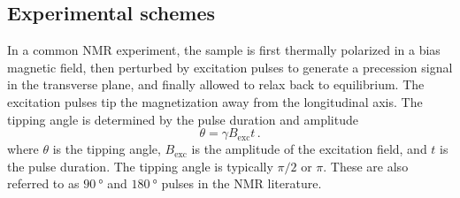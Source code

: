 



\subsection{Experimental schemes}
In a common NMR experiment, the sample is first thermally polarized in a bias magnetic field, then perturbed by excitation pulses to generate a precession signal in the transverse plane, and finally allowed to relax back to equilibrium.
The excitation pulses tip the magnetization away from the longitudinal axis. The tipping angle is determined by the pulse duration and amplitude
\begin{equation}
    \theta = \gamma B_\mathrm{exc} t
    \,.\label{eq:tipping_angle}
\end{equation}
where $\theta$ is the tipping angle, $B_\mathrm{exc}$ is the amplitude of the excitation field, and $t$ is the pulse duration.
The tipping angle is typically $\pi/2$ or $\pi$.
These are also referred to as $\SI{90}{\degree}$ and $\SI{180}{\degree}$ pulses in the NMR literature.



